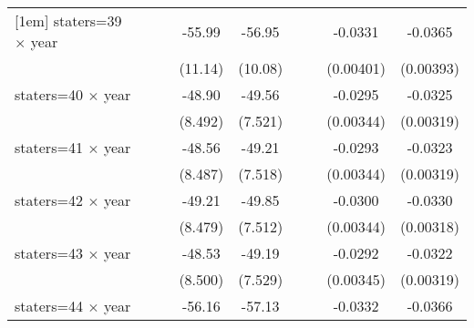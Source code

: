 {\begin{longtable}{l*{8}{c}}
[1em]
staters=39 $\times$ year&                     &                     &      -55.99\sym{***}&      -56.95\sym{***}&                     &                     &     -0.0331\sym{***}&     -0.0365\sym{***}\\
                    &                     &                     &     (11.14)         &     (10.08)         &                     &                     &   (0.00401)         &   (0.00393)         \\
[1em]
staters=40 $\times$ year&                     &                     &      -48.90\sym{***}&      -49.56\sym{***}&                     &                     &     -0.0295\sym{***}&     -0.0325\sym{***}\\
                    &                     &                     &     (8.492)         &     (7.521)         &                     &                     &   (0.00344)         &   (0.00319)         \\
[1em]
staters=41 $\times$ year&                     &                     &      -48.56\sym{***}&      -49.21\sym{***}&                     &                     &     -0.0293\sym{***}&     -0.0323\sym{***}\\
                    &                     &                     &     (8.487)         &     (7.518)         &                     &                     &   (0.00344)         &   (0.00319)         \\
[1em]
staters=42 $\times$ year&                     &                     &      -49.21\sym{***}&      -49.85\sym{***}&                     &                     &     -0.0300\sym{***}&     -0.0330\sym{***}\\
                    &                     &                     &     (8.479)         &     (7.512)         &                     &                     &   (0.00344)         &   (0.00318)         \\
[1em]
staters=43 $\times$ year&                     &                     &      -48.53\sym{***}&      -49.19\sym{***}&                     &                     &     -0.0292\sym{***}&     -0.0322\sym{***}\\
                    &                     &                     &     (8.500)         &     (7.529)         &                     &                     &   (0.00345)         &   (0.00319)         \\
[1em]
staters=44 $\times$ year&                     &                     &      -56.16\sym{***}&      -57.13\sym{***}&                     &                     &     -0.0332\sym{***}&     -0.0366\sym{***}\\

\end{longtable}}
